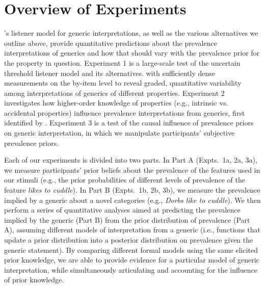 \documentclass[floatsintext,man]{apa6}
\begin{document}





\hypertarget{overview-of-experiments}{%
\section{Overview of Experiments}\label{overview-of-experiments}}

's listener model for generic interpretations, as well as the various alternatives we outline above, provide quantitative predictions about the prevalence interpretations of generics and how that should vary with the prevalence prior for the property in question.
Experiment 1 is a large-scale test of the uncertain threshold listener model and its alternatives. with sufficiently dense measurements on the by-item level to reveal graded, quantitative variability among interpretations of generics of different properties. 
Experiment 2 investigates how higher-order knowledge of properties (e.g., intrinsic vs. accidental properties) influence prevalence interpretations from generics, first identified by .
Experiment 3 is a test of the causal influence of prevalence priors on generic interpretation, in which we manipulate participants' subjective prevalence priors.

Each of our experiments is divided into two parts. 
In Part A (Expts.~1a, 2a, 3a), we measure participants' prior beliefs about the prevalence of the features used in our stimuli (e.g., the prior probabilities of different levels of prevalence of the feature \emph{likes to cuddle}). %
In Part B (Expts.~1b, 2b, 3b), we measure the prevalence implied by a generic about a novel categories (e.g., \emph{Dorbs like to cuddle}). 
We then perform a series of quantitative analyses aimed at predicting the prevalence implied by the generic (Part B) from the prior distribution of prevalence (Part A), assuming different models of interpretation from a generic (i.e., functions that update a prior distribution into a posterior distribution on prevalence given the generic statement). 
By comparing different formal models using the same elicited prior knowledge, we are able to provide evidence for a particular model of generic interpretation, while simultaneously articulating and accounting for the influence of prior knowledge. 
\end{document}
